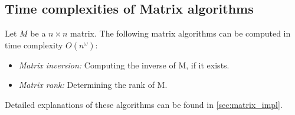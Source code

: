 \subsection{Time complexities of Matrix algorithms}
\label{matrix:time_complexity}
Let \(M\) be a \(n \times n\) matrix. 
The following matrix algorithms can be computed in time complexity \(O(n^\omega)\):
\begin{itemize}
    \item \textit{Matrix inversion:} Computing the inverse of M, if it exists.
    \item \textit{Matrix rank:} Determining the rank of M.
\end{itemize}
Detailed explanations of these algorithms can be found in \cref{sec:matrix_impl}.